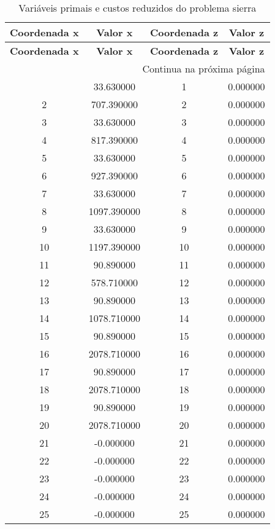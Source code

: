 \documentclass[12pt]{article}
\begin{document}
\begin{longtable}{@{}cccc@{}}
\caption{Variáveis primais e custos reduzidos do problema sierra} \\
\toprule
\textbf{Coordenada x} & \textbf{Valor x} & \textbf{Coordenada z} & \textbf{Valor z} \\
\midrule
\endfirsthead

\toprule
\textbf{Coordenada x} & \textbf{Valor x} & \textbf{Coordenada z} & \textbf{Valor z} \\
\midrule
\endhead

\midrule \multicolumn{4}{r}{{Continua na próxima página}} \\ \midrule
\endfoot

\bottomrule
\endlastfoot
1 & 33.630000 & 1 & 0.000000 \\
2 & 707.390000 & 2 & 0.000000 \\
3 & 33.630000 & 3 & 0.000000 \\
4 & 817.390000 & 4 & 0.000000 \\
5 & 33.630000 & 5 & 0.000000 \\
6 & 927.390000 & 6 & 0.000000 \\
7 & 33.630000 & 7 & 0.000000 \\
8 & 1097.390000 & 8 & 0.000000 \\
9 & 33.630000 & 9 & 0.000000 \\
10 & 1197.390000 & 10 & 0.000000 \\
11 & 90.890000 & 11 & 0.000000 \\
12 & 578.710000 & 12 & 0.000000 \\
13 & 90.890000 & 13 & 0.000000 \\
14 & 1078.710000 & 14 & 0.000000 \\
15 & 90.890000 & 15 & 0.000000 \\
16 & 2078.710000 & 16 & 0.000000 \\
17 & 90.890000 & 17 & 0.000000 \\
18 & 2078.710000 & 18 & 0.000000 \\
19 & 90.890000 & 19 & 0.000000 \\
20 & 2078.710000 & 20 & 0.000000 \\
21 & -0.000000 & 21 & 0.000000 \\
22 & -0.000000 & 22 & 0.000000 \\
23 & -0.000000 & 23 & 0.000000 \\
24 & -0.000000 & 24 & 0.000000 \\
25 & -0.000000 & 25 & 0.000000 \\

\end{longtable}
\end{document}
